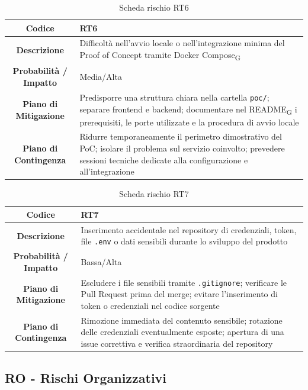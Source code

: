 \begin{table}[H]
	\centering
	\renewcommand{\arraystretch}{1.3}
	\begin{tabularx}{\textwidth}{|c|X|}
		\hline
		\textbf{Codice} & \textbf{RT6} \\
		\hline
		\textbf{Descrizione} & Difficoltà nell'avvio locale o nell'integrazione minima del Proof of Concept tramite Docker Compose\textsubscript{G} \\
		\hline
		\textbf{Probabilità / Impatto} & Media/Alta \\
		\hline
		\textbf{Piano di Mitigazione} & Predisporre una struttura chiara nella cartella \texttt{poc/}; separare frontend e backend; documentare nel README\textsubscript{G} i prerequisiti, le porte utilizzate e la procedura di avvio locale \\
		\hline
		\textbf{Piano di Contingenza} & Ridurre temporaneamente il perimetro dimostrativo del PoC; isolare il problema sul servizio coinvolto; prevedere sessioni tecniche dedicate alla configurazione e all'integrazione \\
		\hline
	\end{tabularx}
	\caption{Scheda rischio RT6}
\end{table}

\begin{table}[H]
	\centering
	\renewcommand{\arraystretch}{1.3}
	\begin{tabularx}{\textwidth}{|c|X|}
		\hline
		\textbf{Codice} & \textbf{RT7} \\
		\hline
		\textbf{Descrizione} & Inserimento accidentale nel repository di credenziali, token, file \texttt{.env} o dati sensibili durante lo sviluppo del prodotto \\
		\hline
		\textbf{Probabilità / Impatto} & Bassa/Alta \\
		\hline
		\textbf{Piano di Mitigazione} & Escludere i file sensibili tramite \texttt{.gitignore}; verificare le Pull Request prima del merge; evitare l'inserimento di token o credenziali nel codice sorgente \\
		\hline
		\textbf{Piano di Contingenza} & Rimozione immediata del contenuto sensibile; rotazione delle credenziali eventualmente esposte; apertura di una issue correttiva e verifica straordinaria del repository \\
		\hline
	\end{tabularx}
	\caption{Scheda rischio RT7}
\end{table}

\subsection{RO - Rischi Organizzativi}

